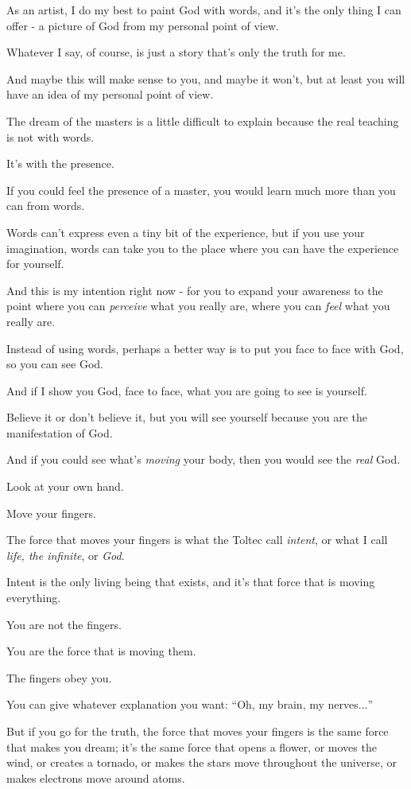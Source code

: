\documentclass{article}
\numberwithin{equation}{section}
\begin{document}
As an artist, I do my best to paint God with words, and it's the only thing I can offer - a picture of God from my personal point of view.

Whatever I say, of course, is just a story that's only the truth for me.

And maybe this will make sense to you, and maybe it won't, but at least you will have an idea of my personal point of view.

%
The dream of the masters is a little difficult to explain because the real teaching is not with words.

It's with the presence.

If you could feel the presence of a master, you would learn much more than you can from words.

Words can't express even a tiny bit of the experience, but if you use your imagination, words can take you to the place where you can have the experience for yourself.

And this is my intention right now - for you to expand your awareness to the point where you can \textit{perceive} what you really are, where you can \textit{feel} what you really are.

%
Instead of using words, perhaps a better way is to put you face to face with God, so you can see God.

And if I show you God, face to face, what you are going to see is yourself.

Believe it or don't believe it, but you will see yourself because you are the manifestation of God.

And if you could see what's \textit{moving} your body, then you would see the \textit{real} God.

Look at your own hand.

Move your fingers.

The force that moves your fingers is what the Toltec call \textit{intent}, or what I call \textit{life, the infinite}, or \textit{God}.

%
Intent is the only living being that exists, and it's that force that is moving everything.

You are not the fingers.

You are the force that is moving them.

The fingers obey you.

You can give whatever explanation you want: ``Oh, my brain, my nerves$\ldots$''

But if you go for the truth, the force that moves your fingers is the same force that makes you dream; it's the same force that opens a flower, or moves the wind, or creates a tornado, or makes the stars move throughout the universe, or makes electrons move around atoms.
\end{document}
